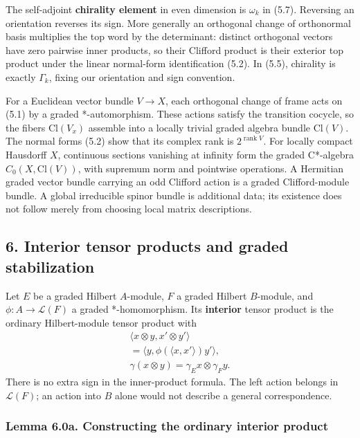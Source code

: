\documentclass[
  11pt,
]{article}
\begin{document}
The self-adjoint \textbf{chirality element} in even dimension is
\(\omega_k\) in (5.7). Reversing an orientation reverses its sign. More
generally an orthogonal change of orthonormal basis multiplies the top
word by the determinant: distinct orthogonal vectors have zero pairwise
inner products, so their Clifford product is their exterior top product
under the linear normal-form identification (5.2). In (5.5), chirality
is exactly \(\Gamma_k\), fixing our orientation and sign convention.

For a Euclidean vector bundle \(V\to X\), each orthogonal change of
frame acts on (5.1) by a graded *-automorphism. These actions satisfy
the transition cocycle, so the fibers \(\mathrm{Cl}(V_x)\) assemble into
a locally trivial graded algebra bundle \(\mathrm{Cl}(V)\). The normal
forms (5.2) show that its complex rank is \(2^{\operatorname{rank}V}\).
For locally compact Hausdorff \(X\), continuous sections vanishing at
infinity form the graded C*-algebra \(C_0(X,\mathrm{Cl}(V))\), with
supremum norm and pointwise operations. A Hermitian graded vector bundle
carrying an odd Clifford action is a graded Clifford-module bundle. A
global irreducible spinor bundle is additional data; its existence does
not follow merely from choosing local matrix descriptions.

\subsection{6. Interior tensor products and graded
stabilization}\label{interior-tensor-products-and-graded-stabilization}

Let \(E\) be a graded Hilbert \(A\)-module, \(F\) a graded Hilbert
\(B\)-module, and \(\phi:A\to\mathcal L(F)\) a graded *-homomorphism.
Its \textbf{interior} tensor product is the ordinary Hilbert-module
tensor product with \[
\begin{gathered}
\langle x\otimes y,x'\otimes y'\rangle\\
=\langle y,\phi(\langle x,x'\rangle)y'\rangle,\\
\gamma(x\otimes y)=\gamma_E x\otimes\gamma_F y.
\end{gathered}
\tag{6.1}
\] There is no extra sign in the inner-product formula. The left action
belongs in \(\mathcal L(F)\); an action into \(B\) alone would not
describe a general correspondence.

\subsubsection{Lemma 6.0a. Constructing the ordinary interior
product}\label{lemma-6.0a.-constructing-the-ordinary-interior-product}
\end{document}
